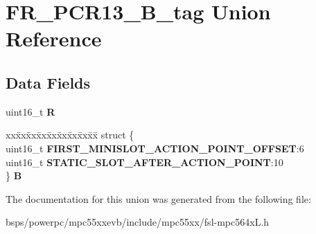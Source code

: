 \hypertarget{unionFR__PCR13__16B__tag}{}\section{F\+R\+\_\+\+P\+C\+R13\+\_\+B\+\_\+tag Union Reference}
\label{unionFR__PCR13__16B__tag}
\subsection*{Data Fields}
\begin{DoxyCompactItemize}
\item 
\mbox{\label{unionFR__PCR13__16B__tag_a81ab77b825a41bd3bb1176f91a247ac6}} 
uint16\+\_\+t {\bfseries R}
\item 
\mbox{\label{unionFR__PCR13__16B__tag_a9728e61a27e18f3d6e70a87925708a55}} 
\begin{tabbing}
xx\=xx\=xx\=xx\=xx\=xx\=xx\=xx\=xx\=\kill
struct \{\\
\>uint16\_t {\bfseries FIRST\_MINISLOT\_ACTION\_POINT\_OFFSET}:6\\
\>uint16\_t {\bfseries STATIC\_SLOT\_AFTER\_ACTION\_POINT}:10\\
\} {\bfseries B}\\

\end{tabbing}\end{DoxyCompactItemize}


The documentation for this union was generated from the following file\+:\begin{DoxyCompactItemize}
\item 
bsps/powerpc/mpc55xxevb/include/mpc55xx/fsl-\/mpc564x\+L.\+h\end{DoxyCompactItemize}
